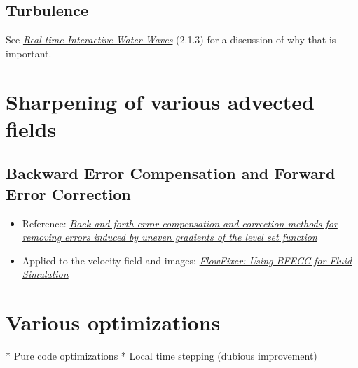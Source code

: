 \subsection{Turbulence}

See \textit{\href{http://publications.dice.se/attachments/water\%20interaction\%20ottosson_bjorn.pdf}{Real-time Interactive Water Waves}} (2.1.3) for a discussion of why that is important.

\section{Sharpening of various advected fields}

\subsection{Backward Error Compensation and Forward Error Correction}

\begin{itemize}
    \item Reference: \textit{\href{http://smartech.gatech.edu/xmlui/bitstream/handle/1853/29473/2002-389.pdf}{Back and forth error compensation and correction methods for removing errors induced by uneven gradients of the level set function}}
    \item Applied to the velocity field and images: \textit{\href{http://www.gvu.gatech.edu/~jarek/papers/FlowFixer.pdf}{FlowFixer: Using BFECC for Fluid Simulation}}
\end{itemize}

\section{Various optimizations}

* Pure code optimizations
* Local time stepping (dubious improvement)
